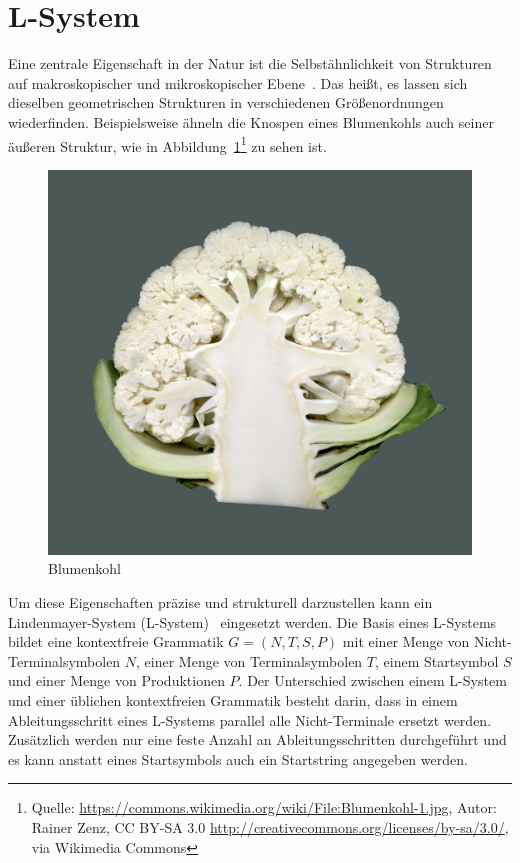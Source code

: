 \section{L-System}\label{sec:L-System}
Eine zentrale Eigenschaft in der Natur ist die Selbstähnlichkeit von Strukturen auf makroskopischer und mikroskopischer Ebene~\cite{Shaker2016}.
Das heißt, es lassen sich dieselben geometrischen Strukturen in verschiedenen Größenordnungen wiederfinden.
Beispielsweise ähneln die Knospen eines Blumenkohls auch seiner äußeren Struktur, wie in Abbildung~\ref{fig:Blumenkohl}\footnote{Quelle: \url{https://commons.wikimedia.org/wiki/File:Blumenkohl-1.jpg}, Autor: Rainer Zenz, CC BY-SA 3.0 \url{http://creativecommons.org/licenses/by-sa/3.0/}, via Wikimedia Commons} zu sehen ist.
\begin{figure}[ht]
    \centering
    \includegraphics[width=0.5\linewidth]{chapters/02_Grundlagen/L_System/Blumenkohl-1.jpg}
    \caption{Blumenkohl}\label{fig:Blumenkohl}
\end{figure}

Um diese Eigenschaften präzise und strukturell darzustellen kann ein Lindenmayer-System (L-System)~\cite{lindenmayer1990} eingesetzt werden.
Die Basis eines L-Systems bildet eine kontextfreie Grammatik $G=(N,T,S,P)$ mit einer Menge von Nicht-Terminalsymbolen $N$, einer Menge von Terminalsymbolen $T$, einem Startsymbol $S$ und einer Menge von Produktionen $P$.
Der Unterschied zwischen einem L-System und einer üblichen kontextfreien Grammatik besteht darin, dass in einem Ableitungsschritt eines L-Systems parallel alle Nicht-Terminale ersetzt werden.
Zusätzlich werden nur eine feste Anzahl an Ableitungsschritten durchgeführt und es kann anstatt eines Startsymbols auch ein Startstring angegeben werden.

